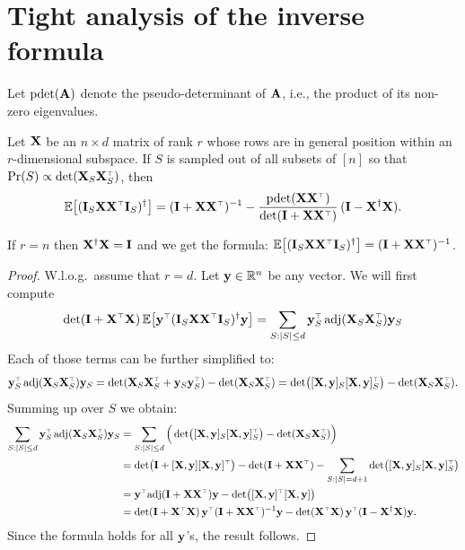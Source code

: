 \documentclass[12pt]{sty/colt2019/colt2018-arxiv}
\begin{document}
\section{Tight analysis of the inverse formula}
Let $\mathrm{pdet}(\mathbf A)$ denote the pseudo-determinant of $\mathbf A$, i.e.,
the product of its non-zero eigenvalues.
\begin{theorem}
  Let $\mathbf X$ be an $n\times d$ matrix of rank $r$ whose rows are in
  general position within an $r$-dimensional subspace.
    If $S$ is sampled out of all subsets of $[n]$ so that $\Pr(S)\propto 
    \det(\X_S\X_S^\top)$, then
    \begin{align*}
    \E\big[(\I_S\X\X^\top\I_S)^\dagger\big] = (\I+\X\X^\top)^{-1} - \frac{\pdet(\X\X^\top)}{\det(\I+\X\X^\top)}\,(\I-\X^\dagger\X).  
    \end{align*}
  \end{theorem}
  \begin{remark}
    If $r= n$ then $\mathbf X^\dagger\mathbf X=\mathbf I$ and we get the
     formula: $\E\big[(\I_S\X\X^\top\I_S)^\dagger\big] = (\I+\X\X^\top)^{-1}$.
   \end{remark}
   \begin{proof}
     W.l.o.g.~assume that $r=d$.
     Let $\mathbf y\in\mathbb R^n$ be any vector. We will first compute
     \begin{align*}
       \det(\I+\X^\top\X)\,\E\big[\y^\top(\I_S\X\X^\top\I_S)^\dagger\y\big] =
       \sum_{S:|S|\leq d}\y_S^\top\adj(\X_S\X_S^\top)\y_S
     \end{align*}
     Each of those terms can be further simplified to:
  \begin{align*}
   \y_S^\top\adj(\X_S\X_S^\top)\y_S =
    \det(\X_S\X_S^\top+\y_S\y_S^\top) - \det(\X_S\X_S^\top)
    =\det\!\big([\X,\y]_S[\X,\y]_S^\top\big) - \det(\X_S\X_S^\top).
  \end{align*}
  Summing up over $S$ we obtain:
  \begin{align*}
    \sum_{S:|S|\leq d}\y_S^\top\adj(\X_S\X_S^\top)\y_S
    & =
    \sum_{S:|S|\leq d} \Big(\det\!\big([\X,\y]_S[\X,\y]_S^\top\big) -
\det(\X_S\X_S^\top)\Big) \\
&= \det\!\big(\I+[\X,\y][\X,\y]^\top\big) -\det(\I + \X\X^\top) -
\sum_{S:|S|=d+1}\det\!\big([\X,\y]_S[\X,\y]_S^\top\big) \\
&= \y^\top\!\adj(\I + \X\X^\top)\y -
\det\!\big([\X,\y]^\top[\X,\y]\big)\\
&=\det(\I+\X^\top\X)\,\y^\top(\I+\X\X^\top)^{-1}\y -
                                            \det(\X^\top\X)\,\y^\top(\I-\X^\dagger\X)\y.
  \end{align*}
  Since the formula holds for all $\mathbf y$'s, the result follows.
   \end{proof}
\end{document}
